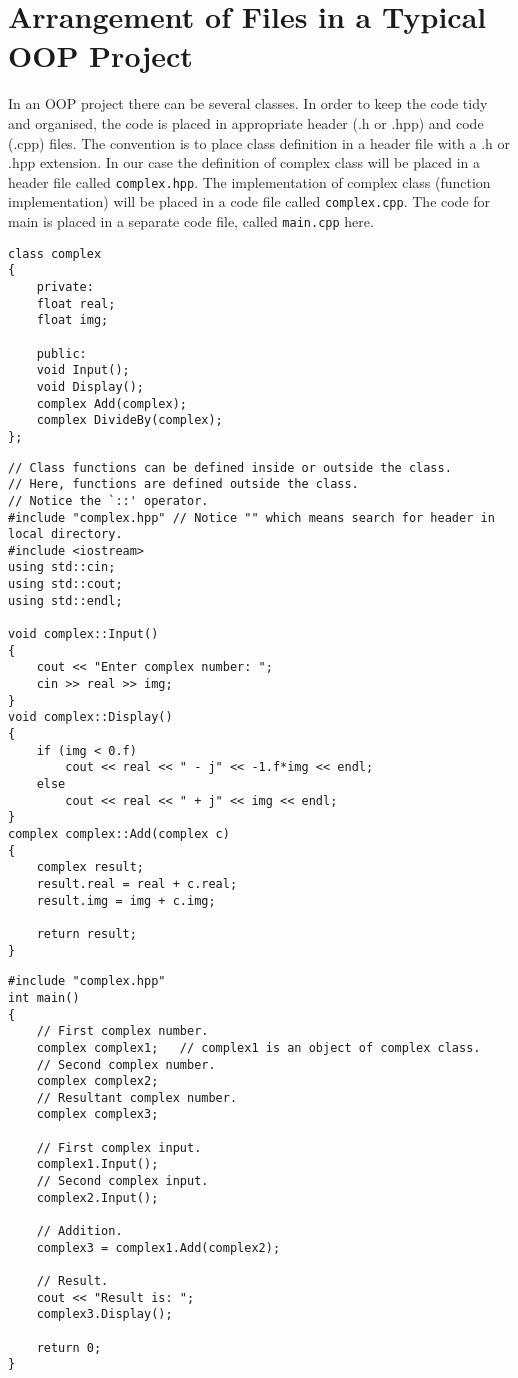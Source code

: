 \documentclass[12pt,a4paper]{article}
\begin{document}
\section{Arrangement of Files in a Typical OOP Project}
In an OOP project there can be several classes. In order to keep the code tidy and organised, the code is placed in appropriate header (.h or .hpp) and code (.cpp) files. The convention is to place class definition in a header file with a .h or .hpp extension. In our case the definition of complex class will be placed in a header file called \verb|complex.hpp|. The implementation of complex class (function implementation) will be placed in a code file called \verb|complex.cpp|. The code for main is placed in a separate code file, called \verb|main.cpp| here.
\begin{lstlisting}[caption={Class Definition (complex.hpp)}]
class complex
{
	private:
	float real;
	float img;
	
	public:
	void Input();
	void Display();
	complex Add(complex);
	complex DivideBy(complex);
};
\end{lstlisting}
\begin{lstlisting}[caption={Class Implementation (complex.cpp)}]
// Class functions can be defined inside or outside the class.
// Here, functions are defined outside the class.
// Notice the `::' operator.
#include "complex.hpp" // Notice "" which means search for header in local directory.
#include <iostream>
using std::cin;
using std::cout;
using std::endl;

void complex::Input()
{
	cout << "Enter complex number: ";
	cin >> real >> img;
}
void complex::Display()
{
	if (img < 0.f)
		cout << real << " - j" << -1.f*img << endl;
	else
		cout << real << " + j" << img << endl;
}
complex complex::Add(complex c)
{
	complex result;
	result.real = real + c.real;
	result.img = img + c.img;
	
	return result;
}
\end{lstlisting}
\begin{lstlisting}[caption={main() function (main.cpp)}]
#include "complex.hpp"
int main()
{
	// First complex number.
	complex complex1;	// complex1 is an object of complex class.
	// Second complex number.
	complex complex2;
	// Resultant complex number.
	complex complex3;
	
	// First complex input.
	complex1.Input();
	// Second complex input.
	complex2.Input();
	
	// Addition.
	complex3 = complex1.Add(complex2);
	
	// Result.
	cout << "Result is: ";
	complex3.Display();
	
	return 0;
}
\end{lstlisting}
\end{document}
